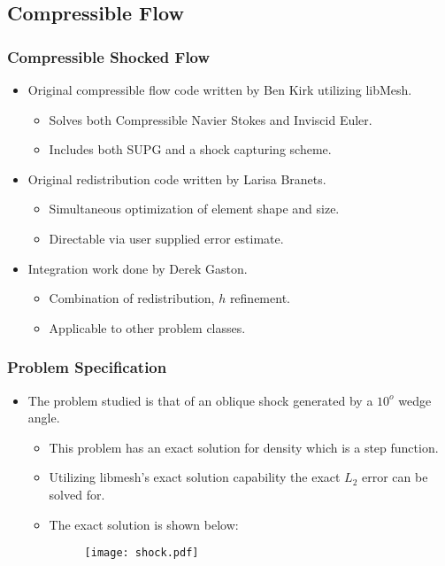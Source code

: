 \subsection*{Compressible Flow}

\frame
{
  \frametitle{Compressible Shocked Flow}
  \begin{itemize}[<+->]
    \item Original compressible flow code written by Ben Kirk utilizing libMesh.
      \begin{itemize}[<+->]
      \item Solves both Compressible Navier Stokes and Inviscid Euler.
      \item Includes both SUPG and a shock capturing scheme.
      \end{itemize}
    \item Original redistribution code written by Larisa Branets.
      \begin{itemize}[<+->]
      \item Simultaneous optimization of element shape and size.
      \item Directable via user supplied error estimate.
      \end{itemize}
    \item Integration work done by Derek Gaston.
      \begin{itemize}[<+->]
      \item Combination of redistribution, $h$ refinement.
      \item Applicable to other problem classes.
      \end{itemize}
  \end{itemize}
}

\frame
{
  \frametitle{Problem Specification}
  \begin{itemize}[<+->]
    \item The problem studied is that of an oblique shock generated by a $10^o$ wedge angle. 
      \begin{itemize}[<+->]
      \item This problem has an exact solution for density which is a step function.
      \item Utilizing libmesh's exact solution capability the exact
$L_2$ error can be solved for.
      \item The exact solution is shown below:
        \begin{figure}
          \begin{center}
            \texttt{[image: shock.pdf]}
          \end{center}
        \end{figure}
    \end{itemize}
  \end{itemize}
}

